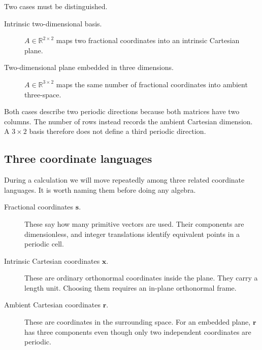 Two cases must be distinguished.

\begin{description}
  \item[Intrinsic two-dimensional basis.] $A\in\mathbb R^{2\times2}$ maps two
    fractional coordinates into an intrinsic Cartesian plane.
  \item[Two-dimensional plane embedded in three dimensions.]
    $A\in\mathbb R^{3\times2}$ maps the same number of fractional coordinates
    into ambient three-space.
\end{description}

Both cases describe two periodic directions because both matrices have two
columns. The number of rows instead records the ambient Cartesian dimension.
A $3\times2$ basis therefore does not define a third periodic direction.

\subsection{Three coordinate languages}

During a calculation we will move repeatedly among three related coordinate
languages. It is worth naming them before doing any algebra.

\begin{description}
  \item[Fractional coordinates $\mathbf s$.]
    These say how many primitive vectors are used. Their components are
    dimensionless, and integer translations identify equivalent points in a
    periodic cell.
  \item[Intrinsic Cartesian coordinates $\mathbf x$.]
    These are ordinary orthonormal coordinates inside the plane. They carry a
    length unit. Choosing them requires an in-plane orthonormal frame.
  \item[Ambient Cartesian coordinates $\mathbf r$.]
    These are coordinates in the surrounding space. For an embedded plane,
    $\mathbf r$ has three components even though only two independent
    coordinates are periodic.
\end{description}

